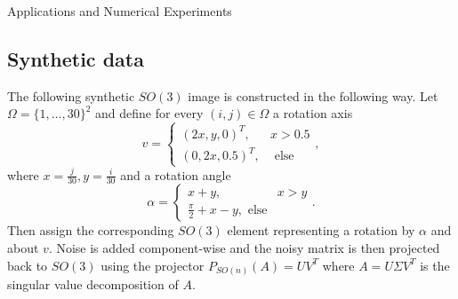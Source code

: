 \begin{chapter}{Applications and Numerical Experiments}
\subsection{Synthetic data} %
\label{sub:SyntheticdataSO}
The following synthetic $SO(3)$ image is constructed in the following way. Let $\Omega=\lbrace 1,\ldots,30 \rbrace^2$ and define for every $(i,j)\in\Omega$
a rotation axis
\begin{equation}
	v = \begin{cases}
	    (2x,y,0)^{T}, & x>0.5\\
	    (0,2x,0.5)^{T}, & \text{ else}
	\end{cases},
\end{equation}
where $x=\frac{j}{30}, y=\frac{i}{30}$ and a rotation angle
\begin{equation}
    \alpha = \begin{cases}
	   x + y, & x > y\\
	   \frac{\pi}{2} + x - y, \text{ else}
    \end{cases}.
\end{equation}
Then assign the corresponding $SO(3)$ element representing a rotation by $\alpha$ and about $v$. Noise is added component-wise and the noisy matrix is
then projected back to $SO(3)$ using the projector $P_{SO(n)}(A)=UV^{T}$ where $A=U\Sigma V^T$ is the singular value decomposition of $A$.


\end{chapter}
